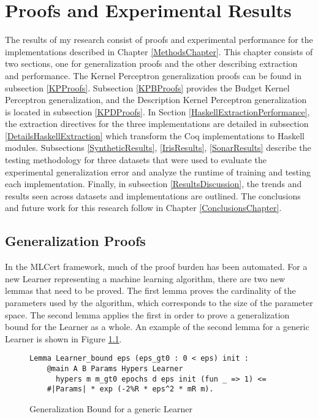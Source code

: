 \chapter{Proofs and Experimental Results}\label{ResultsChapter}
The results of my research consist of proofs and experimental performance for the implementations described in Chapter \ref{MethodsChapter}. This chapter consists of two sections, one for generalization proofs and the other describing extraction and performance. The Kernel Perceptron generalization proofs can be found in subsection \ref{KPProofs}. Subsection \ref{KPBProofs} provides the Budget Kernel Perceptron generalization, and the Description Kernel Perceptron generalization is located in subsection \ref{KPDProofs}. In Section \ref{HaskellExtractionPerformance}, the extraction directives for the three implementations are detailed in subsection \ref{DetailsHaskellExtraction} which transform the Coq implementations to Haskell modules. Subsections \ref{SyntheticResults}, \ref{IrisResults}, \ref{SonarResults} describe the testing methodology for three datasets that were used to evaluate the experimental generalization error and analyze the runtime of training and testing each implementation. Finally, in subsection \ref{ResultsDiscussion}, the trends and results seen across datasets and implementations are outlined. The conclusions and future work for this research follow in Chapter \ref{ConclusionsChapter}.
\section{Generalization Proofs}\label{Proofs}
In the MLCert framework, much of the proof burden has been automated. For a new Learner representing a machine learning algorithm, there are two new lemmas that need to be proved. The first lemma proves the cardinality of the parameters used by the algorithm, which corresponds to the size of the parameter space. The second lemma applies the first in order to prove a generalization bound for the Learner as a whole. An example of the second lemma for a generic Learner is shown in Figure \ref{LearnerLemma}.

\begin{figure}
    \caption{Generalization Bound for a generic Learner}
    \label{LearnerLemma}
    \begin{lstlisting}
Lemma Learner_bound eps (eps_gt0 : 0 < eps) init : 
    @main A B Params Hypers Learner
      hypers m m_gt0 epochs d eps init (fun _ => 1) <=
    #|Params| * exp (-2%R * eps^2 * mR m).
    \end{lstlisting}
\end{figure}

